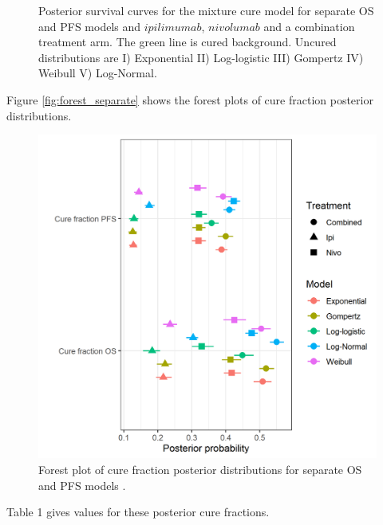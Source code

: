 \documentclass[
]{article}
\begin{document}
\begin{figure}
{}

\caption{\label{fig:S_separate}Posterior survival curves for the mixture cure model for separate OS and PFS models and $ipilimumab$, $nivolumab$ and a combination treatment arm. The green line is cured background. Uncured distributions are I) Exponential  II) Log-logistic III) Gompertz IV) Weibull V) Log-Normal.}\label{fig:unnamed-chunk-3}
\end{figure}

Figure \ref{fig:forest_separate} shows the forest plots of cure fraction
posterior distributions.

\begin{figure}

{\centering \includegraphics[width=0.6\linewidth]{../plots/cf separate_bg_fixed_forest_plot} 

}

\caption{\label{fig:forest_separate}Forest plot of cure fraction posterior distributions for separate OS and PFS models .}\label{fig:unnamed-chunk-4}
\end{figure}

Table 1 gives values for these posterior cure fractions.
\end{document}
